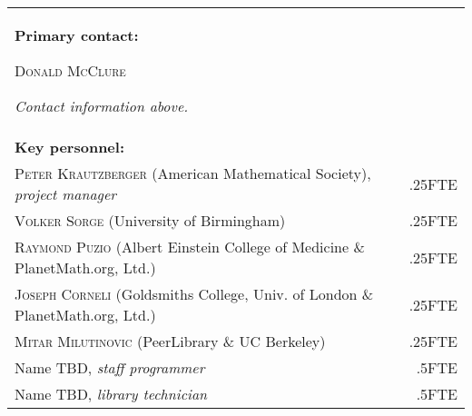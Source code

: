 \documentclass[10pt]{article}
\begin{document}
\bigskip

\begin{tabular}{p{}r}
\textbf{Primary contact:} \par
\textsc{Donald McClure} 
\par \emph{Contact information above.} &  \\[1cm]
\textbf{Key personnel:} &\\
\textsc{Peter Krautzberger} (American Mathematical Society), \emph{project manager}&.25FTE\\
\textsc{Volker Sorge} (University of Birmingham) &.25FTE \\
\textsc{Raymond Puzio} (Albert Einstein College of Medicine \& PlanetMath.org, Ltd.) & .25FTE \\
\textsc{Joseph Corneli} (Goldsmiths College, Univ. of London \& PlanetMath.org, Ltd.) &.25FTE \\
\textsc{Mitar Milutinovic} (PeerLibrary \& UC Berkeley)  &.25FTE \\
Name TBD, \emph{staff programmer}   &.5FTE \\
Name TBD, \emph{library technician}  &.5FTE \\
\end{tabular}
\end{document}
